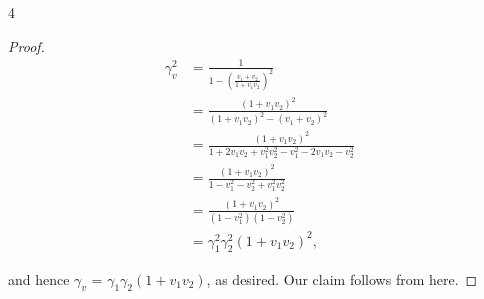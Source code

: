 \documentclass[11pt]{article}
\begin{document}
\begin{problem}{4}
\begin{enumerate}[label=(\alph*)]
\begin{proof}
            \begin{equation}
            \begin{aligned}
            \label{eq:62}
              \gamma_v^2 &= \frac{1}{1 - (\frac{v_{1} + v_2}{1 + v_1v_2})^2} \\
                    &= \frac{(1+v_{1}v_2)^2}{(1+v_1v_2)^2 - (v_1 + v_2)^2} \\
                    &= \frac{(1+v_{1}v_2)^2}{1 + 2v_1v_2 + v_1^2v_2^2 - v_1^2 - 2v_1v_2 - v_2^2} \\
                    &= \frac{(1 + v_{1}v_2)^2}{1 - v_1^2 - v_2^2 + v_1^2v_2^2} \\
                    &= \frac{(1+v_{1}v_2)^2}{(1-v_1^2)(1-v_2^2)} \\
              &= \gamma_1^2\gamma_2^2(1+ v_1v_2)^2,
            \end{aligned}
            \end{equation}

            and hence \(\gamma_v\) = \(\gamma_1\gamma_2(1+v_1v_2)\), as desired.
            Our claim follows from here.
          \end{proof}
	\end{enumerate}
\end{problem}
\end{document}
